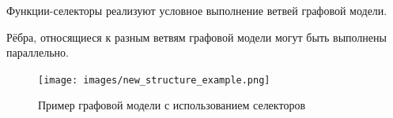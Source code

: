 \begin{frame}
  \begin{remark}
    Функции-селекторы реализуют условное выполнение ветвей графовой модели.
  \end{remark}
  \begin{remark}
    Рёбра, относящиеся к разным ветвям графовой модели могут быть выполнены параллельно.
  \end{remark}
  \begin{figure}
    \centering
    \texttt{[image: images/new\_structure\_example.png]}
    \caption{Пример графовой модели с использованием селекторов}
  \end{figure}
\end{frame}